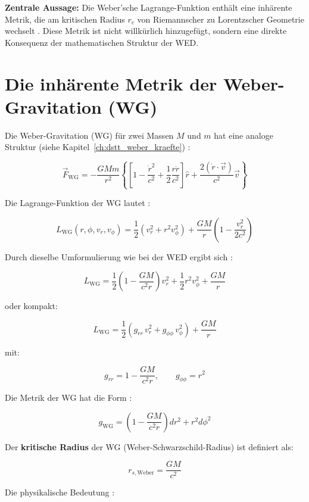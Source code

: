 \textbf{Zentrale Aussage:} Die Weber'sche Lagrange-Funktion enthält eine inhärente Metrik, die am kritischen Radius \( r_c \) von Riemannscher zu Lorentzscher Geometrie wechselt \cite{FrauenfelderWeber2024}. Diese Metrik ist nicht willkürlich hinzugefügt, sondern eine direkte Konsequenz der mathematischen Struktur der WED.

\section{Die inhärente Metrik der Weber-Gravitation (WG)}
\label{app:weber_metrik_wg}

Die Weber-Gravitation (WG) für zwei Massen \( M \) und \( m \) hat eine analoge Struktur (siehe Kapitel~\ref{ch:dstt_weber_kraefte}) \cite{Assis2005}:

\[
\vec{F}_{\text{WG}} = -\frac{GMm}{r^2}
\left\{
\left[
1 - \frac{\dot{r}^2}{c^2} + \frac{1}{2}\frac{r\ddot{r}}{c^2}
\right] \hat{r}
+ \frac{2(\dot{r} \cdot \vec{v})}{c^2} \vec{v}
\right\}
\tag{M.7}
\]

Die Lagrange-Funktion der WG lautet \cite{Assis2005}:

\[
L_{\text{WG}}(r,\phi,v_r,v_\phi) = \frac{1}{2}(v_r^2 + r^2 v_\phi^2) + \frac{GM}{r}
\left(1 - \frac{v_r^2}{2c^2}\right)
\tag{M.8}
\]

Durch dieselbe Umformulierung wie bei der WED ergibt sich \cite{FrauenfelderWeber2024}:

\[
L_{\text{WG}} = \frac{1}{2}\left(1 - \frac{GM}{c^2 r}\right) v_r^2 + \frac{1}{2} r^2 v_\phi^2 + \frac{GM}{r}
\tag{M.9}
\]

oder kompakt:

\[
L_{\text{WG}} = \frac{1}{2}\left( g_{rr}\, v_r^2 + g_{\phi\phi}\, v_\phi^2 \right) + \frac{GM}{r}
\tag{M.10}
\]

mit:

\[
g_{rr} = 1 - \frac{GM}{c^2 r}, \qquad g_{\phi\phi} = r^2
\tag{M.11}
\]

Die Metrik der WG hat die Form \cite{FrauenfelderWeber2024}:

\[
g_{\text{WG}} = \left(1 - \frac{GM}{c^2 r}\right) dr^2 + r^2 d\phi^2
\tag{M.12}
\]

Der \textbf{kritische Radius} der WG (Weber-Schwarzschild-Radius) ist definiert als:

\[
r_{s,\text{Weber}} = \frac{GM}{c^2}
\tag{M.13}
\]

Die physikalische Bedeutung \cite{FrauenfelderWeber2024}:

